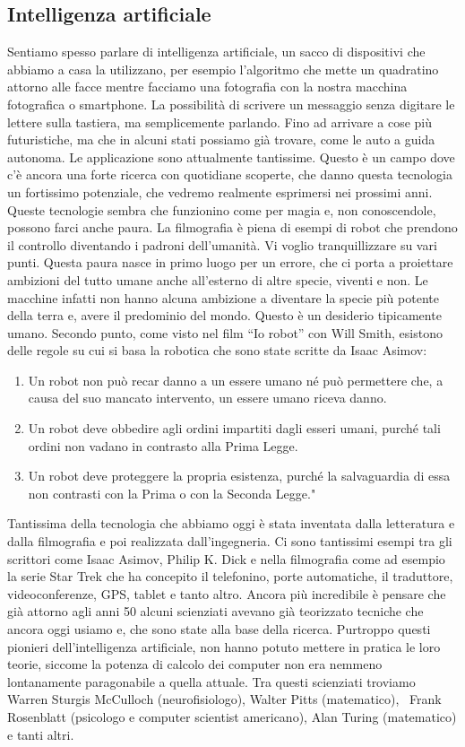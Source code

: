 \documentclass[12pt]{book} %
\begin{document}
\subsection{Intelligenza artificiale}
Sentiamo spesso parlare di intelligenza artificiale, un sacco di dispositivi che abbiamo a casa la utilizzano, per
esempio l'algoritmo che mette un quadratino attorno alle facce mentre facciamo una fotografia con
la nostra macchina fotografica o smartphone. La possibilità di scrivere un messaggio senza digitare le lettere sulla
tastiera, ma semplicemente parlando. Fino ad arrivare a cose più futuristiche, ma che in alcuni stati possiamo già
trovare, come le auto a guida autonoma. Le applicazione sono attualmente tantissime. Questo è un campo dove
c'è ancora una forte ricerca con quotidiane scoperte, che danno questa tecnologia un fortissimo
potenziale, che vedremo realmente esprimersi nei prossimi anni. Queste tecnologie sembra che funzionino come per magia
e, non conoscendole, possono farci anche paura. La filmografia è piena di esempi di robot che prendono il controllo
diventando i padroni dell'umanità. Vi voglio tranquillizzare su vari punti. Questa paura nasce in
primo luogo per un errore, che ci porta a proiettare ambizioni del tutto umane anche all'esterno
di altre specie, viventi e non. Le macchine infatti non hanno alcuna ambizione a diventare la specie più potente della
terra e, avere il predominio del mondo. Questo è un desiderio tipicamente umano. Secondo punto, come visto nel film “Io
robot” con Will Smith, esistono delle regole su cui si basa la robotica che sono state scritte da Isaac Asimov:

\begin{enumerate}
\item Un robot non può recar danno a un essere umano né può permettere che, a causa del suo mancato intervento, un
essere umano riceva danno.
\item Un robot deve obbedire agli ordini impartiti dagli esseri umani, purché tali ordini non vadano in contrasto alla
Prima Legge.
\item Un robot deve proteggere la propria esistenza, purché la salvaguardia di essa non contrasti con la Prima o con la
Seconda Legge."
\end{enumerate}
Tantissima della tecnologia che abbiamo oggi è stata inventata dalla letteratura e dalla filmografia e poi realizzata
dall'ingegneria. Ci sono tantissimi esempi tra gli scrittori come Isaac Asimov, Philip K. Dick e
nella filmografia come ad esempio la serie Star Trek che ha concepito il telefonino, porte automatiche, il traduttore,
videoconferenze, GPS, tablet e tanto altro. Ancora più incredibile è pensare che già attorno agli anni 50 alcuni
scienziati avevano già teorizzato tecniche che ancora oggi usiamo e, che sono state alla base della ricerca. Purtroppo
questi pionieri dell'intelligenza artificiale, non hanno potuto mettere in pratica le loro teorie,
siccome la potenza di calcolo dei computer non era nemmeno lontanamente paragonabile a quella attuale. Tra questi
scienziati troviamo Warren Sturgis McCulloch (neurofisiologo), Walter Pitts (matematico), \ Frank Rosenblatt (psicologo
e computer scientist americano), Alan Turing (matematico) e tanti altri.
\end{document}
